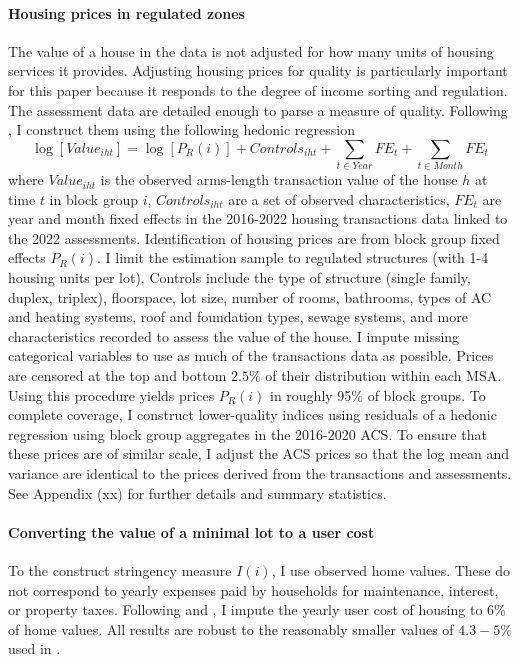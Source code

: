 \documentclass[11pt]{article}
\begin{document}
\paragraph*{Housing prices in regulated zones} The value of a house in the data is not adjusted for how many units of housing services it provides. Adjusting housing prices for quality is particularly important for this paper because it responds to the degree of income sorting and regulation. The assessment data are detailed enough to parse a measure of quality. Following \cite{BSH}, I construct them using the following hedonic regression
\begin{equation}\label{hedonicIndex}
	\log[Value_{iht}] = \log[P_{R}(i)] + Controls_{iht} + \sum_{t \in Year}FE_{t} + \sum_{t \in Month}FE_{t}
\end{equation} 
where $Value_{iht}$ is the observed arms-length transaction value of the house $h$ at time $t$ in block group $i$, $Controls_{iht}$ are a set of observed characteristics, $FE_{t}$ are year and month fixed effects in the 2016-2022 housing transactions data linked to the 2022 assessments. Identification of housing prices are from block group fixed effects $P_{R}(i)$. I limit the estimation sample to regulated structures (with 1-4 housing units per lot). Controls include the type of structure (single family, duplex, triplex), floorspace, lot size, number of rooms, bathrooms, types of AC and heating systems, roof and foundation types, sewage systems, and more characteristics recorded to assess the value of the house. I impute missing categorical variables to use as much of the transactions data as possible. Prices are censored at the top and bottom $2.5\%$ of their distribution within each MSA. Using this procedure yields prices $P_{R}(i)$ in roughly 95\% of block groups. To complete coverage, I construct lower-quality indices using residuals of a hedonic regression using block group aggregates in the 2016-2020 ACS. To ensure that these prices are of similar scale, I adjust the ACS prices so that the log mean and variance are identical to the prices derived from the transactions and assessments. See Appendix (xx) for further details and summary statistics. 

\paragraph*{Converting the value of a minimal lot to a user cost} To the construct stringency measure $I(i)$, I use observed home values. These do not correspond to yearly expenses paid by households for maintenance, interest, or property taxes. Following \cite{AttanasioPistaferri} and \cite{straub2019}, I impute the yearly user cost of housing to $6\%$ of home values. All results are robust to the reasonably smaller values of  $4.3 - 5\%$ used in \cite{Coutureetal}. 
\end{document}

